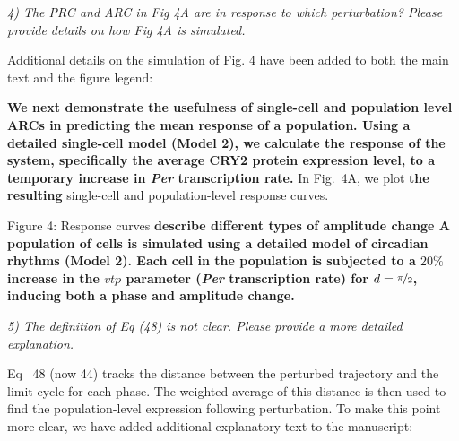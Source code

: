 \documentclass[11pt, letterpaper]{article}
\newenvironment{reviewer}{\itshape\color{gray}}{}
\newenvironment{manuscript}[1]{\begin{center}\begin{tcolorbox}[colback=green!5!white,colframe=green!75!black,width=0.8\textwidth,title={#1},breakable,fonttitle=\bfseries]}{\end{tcolorbox}\end{center}}
\begin{document}
\begin{reviewer}
4) The PRC and ARC in Fig 4A are in response to which perturbation?
Please provide details on how Fig 4A is simulated.
\end{reviewer}

Additional details on the simulation of Fig. 4 have been added to both the main text and the figure legend:

\begin{manuscript}{Page 14}
{\bfseries We next demonstrate the usefulness of single-cell and population level ARCs in predicting the mean response of a population.
  Using a detailed single-cell model (Model 2), we calculate the response of the system, specifically the average CRY2 protein expression level, to a temporary increase in {\itshape Per} transcription rate.}
In Fig.~4A, we plot {\bfseries the resulting} single-cell and population-level response curves.
\end{manuscript}

\begin{manuscript}{Page 15}
  Figure 4: Response curves {\bfseries describe different types of amplitude change
A population of cells is simulated using a detailed model of circadian rhythms (Model 2).
Each cell in the population is subjected to a $20\%$ increase in the $\mathit{vtp}$ parameter ({\itshape Per} transcription rate) for $d=\nicefrac{\pi}{2}$, inducing both a phase and amplitude change.}
\end{manuscript}

\begin{reviewer}
5) The definition of Eq (48) is not clear.
Please provide a more detailed explanation.
\end{reviewer}

Eq~ 48 (now 44) tracks the distance between the perturbed trajectory and the limit cycle for each phase.
The weighted-average of this distance is then used to find the population-level expression following perturbation.
To make this point more clear, we have added additional explanatory text to the manuscript:
\end{document}
